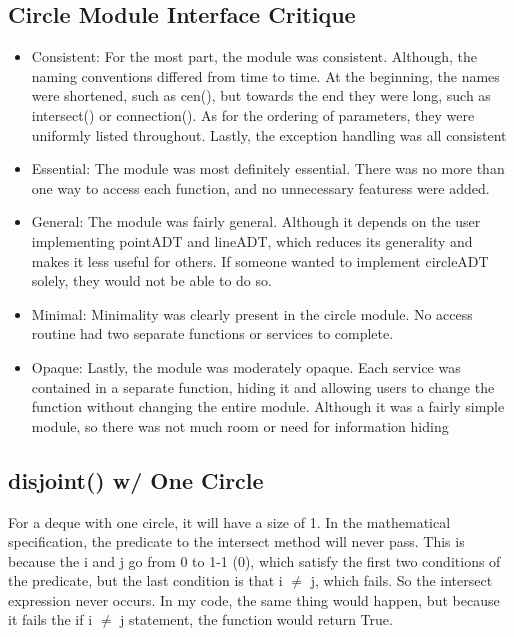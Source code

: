 \documentclass[12pt]{article}
\begin{document}
\subsection{Circle Module Interface Critique}
\begin{itemize}
\item Consistent: For the most part, the module was consistent. Although, the naming conventions differed from time to time.
At the beginning, the names were shortened, such as cen(), but towards the end they were long, such as intersect() or connection(). As for the ordering of parameters, they were uniformly listed throughout. Lastly, the exception handling was all consistent
\item Essential: The module was most definitely essential. There was no more than one way to access each function, and no unnecessary featuress were added.
\item General: The module was fairly general. Although it depends on the user implementing pointADT and lineADT, which reduces its generality and makes it less useful for others. If someone wanted to implement circleADT solely, they would not be able to do so.
\item Minimal: Minimality was clearly present in the circle module. No access routine had two separate functions or services to complete.
\item Opaque: Lastly, the module was moderately opaque. Each service was contained in a separate function, hiding it and allowing users to change the function without changing the entire module. Although it was a fairly simple module, so there was not much room or need for information hiding
\end{itemize}



\subsection{disjoint() w/ One Circle}
For a deque with one circle, it will have a size of 1. In the mathematical specification, the predicate to the intersect method will
never pass. This is because the i and j go from 0 to 1-1 (0), which satisfy the first two conditions of the predicate, but the last condition is that i $\neq$ j, which fails. So the intersect expression never occurs. 
In my code, the same thing would happen, but because it fails the if i $\neq$ j statement, the function would return True.

\newpage

\lstset{language=Python, basicstyle=\tiny,breaklines=true,showspaces=false,showstringspaces=false,breakatwhitespace=true}
\end{document}

